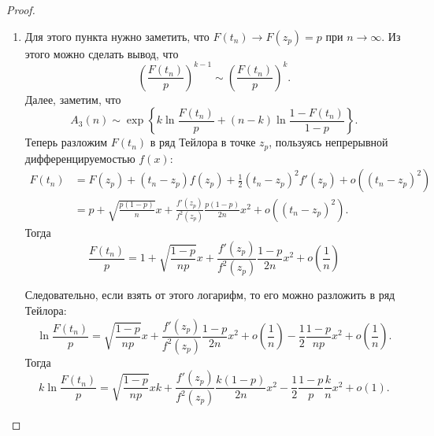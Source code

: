 \begin{proof}
\begin{enumerate}
		\item Для этого пункта нужно заметить, что $F(t_{n}) \to F(z_{p}) = p$ при $n \to \infty$.
		Из этого можно сделать вывод, что
		\[
			\left(\frac{F(t_{n})}{p}\right)^{k - 1} \sim \left(\frac{F(t_{n})}{p}\right)^{k}.
		\]
		Далее, заметим, что
		\[
			A_{3}(n) \sim \exp\left\{k\ln\frac{F(t_{n})}{p} + (n - k)\ln\frac{1 - F(t_{n})}{1 - p}\right\}.
		\]
		Теперь разложим $F(t_{n})$ в ряд Тейлора в точке $z_{p}$, пользуясь непрерывной дифференцируемостью $f(x)$:
		\begin{align*}
			F(t_{n}) 
			&= F(z_{p}) + (t_{n} - z_{p})f(z_{p}) + \frac{1}{2}(t_{n} - z_{p})^{2}f'(z_{p}) + o((t_{n} - z_{p})^{2}) \\
			&= p + \sqrt{\frac{p(1 - p)}{n}} x + \frac{f'(z_{p})}{f^{2}(z_{p})}\frac{p(1 - p)}{2n}x^{2} + o((t_{n} - z_{p})^{2}).
		\end{align*}
		Тогда
		\[
			\frac{F(t_{n})}{p} = 1 + \sqrt{\frac{1 - p}{np}}x + \frac{f'(z_{p})}{f^{2}(z_{p})}\frac{1 - p}{2n}x^{2} + o\left(\frac{1}{n}\right)
		\]
		
		Следовательно, если взять от этого логарифм, то его можно разложить в ряд Тейлора:
		\[
			\ln \frac{F(t_{n})}{p} = \sqrt{\frac{1 - p}{np}}x + \frac{f'(z_{p})}{f^{2}(z_{p})}\frac{1 - p}{2n}x^{2} + o\left(\frac{1}{n}\right) - \frac{1}{2}\frac{1 - p}{np}x^{2} + o\left(\frac{1}{n}\right).
		\]
		Тогда
		\[
			k\ln \frac{F(t_{n})}{p} = \sqrt{\frac{1 - p}{np}}xk + \frac{f'(z_{p})}{f^{2}(z_{p})}\frac{k(1 - p)}{2n}x^{2} - \frac{1}{2}\frac{1 - p}{p}\frac{k}{n}x^{2} + o\left(1\right).
		\]
		

\end{enumerate}
\end{proof}
